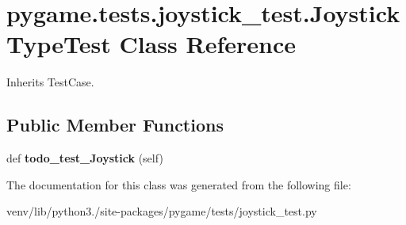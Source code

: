 \hypertarget{classpygame_1_1tests_1_1joystick__test_1_1_joystick_type_test}{}\section{pygame.\+tests.\+joystick\+\_\+test.\+Joystick\+Type\+Test Class Reference}
\label{classpygame_1_1tests_1_1joystick__test_1_1_joystick_type_test}


Inherits Test\+Case.

\subsection*{Public Member Functions}
\begin{DoxyCompactItemize}
\item 
\mbox{\label{classpygame_1_1tests_1_1joystick__test_1_1_joystick_type_test_a063f1d504c0a13bf14bff158c07f39e6}} 
def {\bfseries todo\+\_\+test\+\_\+\+Joystick} (self)
\end{DoxyCompactItemize}


The documentation for this class was generated from the following file\+:\begin{DoxyCompactItemize}
\item 
venv/lib/python3./site-\/packages/pygame/tests/joystick\+\_\+test.\+py\end{DoxyCompactItemize}

